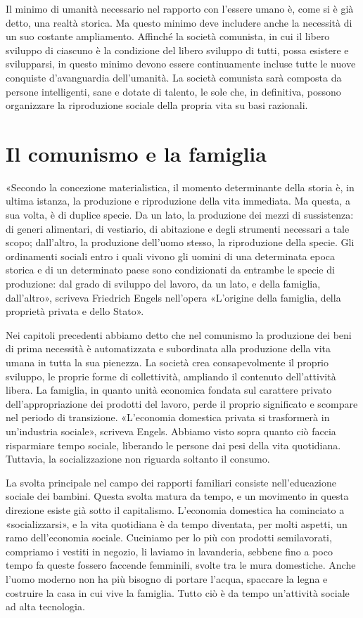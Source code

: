 \documentclass[12pt,a4paper,openany]{book}
\begin{document}
Il minimo di umanità necessario nel rapporto con l'essere umano è, come si è già detto, una realtà storica. Ma questo minimo deve includere anche la necessità di un suo costante ampliamento. Affinché la società comunista, in cui il libero sviluppo di ciascuno è la condizione del libero sviluppo di tutti, possa esistere e svilupparsi, in questo minimo devono essere continuamente incluse tutte le nuove conquiste d'avanguardia dell'umanità. La società comunista sarà composta da persone intelligenti, sane e dotate di talento, le sole che, in definitiva, possono organizzare la riproduzione sociale della propria vita su basi razionali.
\ifSubfilesClassLoaded{\setcounter{page}{50}}{}
\section{Il comunismo e la famiglia}
\label{sec:09_comunismo_famiglia}

«Secondo la concezione materialistica, il momento determinante della storia è, in ultima istanza, la produzione e riproduzione della vita immediata. Ma questa, a sua volta, è di duplice specie. Da un lato, la produzione dei mezzi di sussistenza: di generi alimentari, di vestiario, di abitazione e degli strumenti necessari a tale scopo; dall'altro, la produzione dell'uomo stesso, la riproduzione della specie. Gli ordinamenti sociali entro i quali vivono gli uomini di una determinata epoca storica e di un determinato paese sono condizionati da entrambe le specie di produzione: dal grado di sviluppo del lavoro, da un lato, e della famiglia, dall'altro», scriveva Friedrich Engels nell'opera «L'origine della famiglia, della proprietà privata e dello Stato».

Nei capitoli precedenti abbiamo detto che nel comunismo la produzione dei beni di prima necessità è automatizzata e subordinata alla produzione della vita umana in tutta la sua pienezza. La società crea consapevolmente il proprio sviluppo, le proprie forme di collettività, ampliando il contenuto dell'attività libera. La famiglia, in quanto unità economica fondata sul carattere privato dell'appropriazione dei prodotti del lavoro, perde il proprio significato e scompare nel periodo di transizione. «L'economia domestica privata si trasformerà in un'industria sociale», scriveva Engels. Abbiamo visto sopra quanto ciò faccia risparmiare tempo sociale, liberando le persone dai pesi della vita quotidiana. Tuttavia, la socializzazione non riguarda soltanto il consumo.

La svolta principale nel campo dei rapporti familiari consiste nell'educazione sociale dei bambini. Questa svolta matura da tempo, e un movimento in questa direzione esiste già sotto il capitalismo. L'economia domestica ha cominciato a «socializzarsi», e la vita quotidiana è da tempo diventata, per molti aspetti, un ramo dell'economia sociale. Cuciniamo per lo più con prodotti semilavorati, compriamo i vestiti in negozio, li laviamo in lavanderia, sebbene fino a poco tempo fa queste fossero faccende femminili, svolte tra le mura domestiche. Anche l'uomo moderno non ha più bisogno di portare l'acqua, spaccare la legna e costruire la casa in cui vive la famiglia. Tutto ciò è da tempo un'attività sociale ad alta tecnologia.
\end{document}
